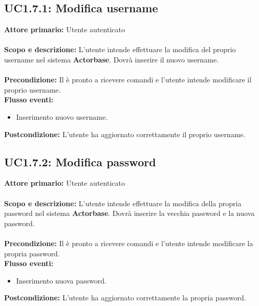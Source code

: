 \documentclass{scalatekids-article}
\begin{document}
\subsection{UC1.7.1: Modifica username}
\textbf{Attore primario:} Utente autenticato\\ \\
\textbf{Scopo e descrizione:} L'utente intende effettuare la modifica del proprio username nel sistema \textbf{Actorbase}. Dovrà inserire il nuovo username.\\ \\
\textbf{Precondizione:} Il  è pronto a ricevere comandi e l'utente intende modificare il proprio username.\\
\textbf{Flusso eventi:}
\begin{itemize}
\item Inserimento nuovo username.
\end{itemize}
\textbf{Postcondizione:} L'utente ha aggiornato correttamente il proprio username.
\subsection{UC1.7.2: Modifica password}
\textbf{Attore primario:} Utente autenticato\\ \\
\textbf{Scopo e descrizione:} L'utente intende effettuare la modifica della propria password nel sistema \textbf{Actorbase}. Dovrà inserire la vecchia password e la nuova password.\\ \\
\textbf{Precondizione:} Il  è pronto a ricevere comandi e l'utente intende modificare la propria password.\\
\textbf{Flusso eventi:}
\begin{itemize}
\item Inserimento nuova password.
\end{itemize}
\textbf{Postcondizione:} L'utente ha aggiornato correttamente la propria password.
\end{document}
